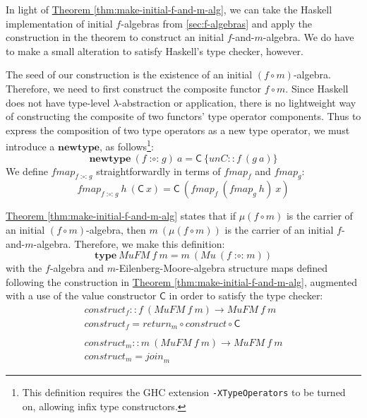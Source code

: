 \documentclass{jfp1}
\newcommand{\thmref}[1]{\hyperref[#1]{Theorem \ref*{#1}}}
\newcommand{\kw}[1]{\textbf{#1}}
\begin{document}
\newcommand{\fcompose}{\mathop{\mathord:\circ\mathord:}}

In light of \thmref{thm:make-initial-f-and-m-alg}, we can take the
Haskell implementation of initial $f$-algebras from
\autoref{sec:f-algebras} and apply the construction in the
theorem to construct an initial $f$-and-$m$-algebra. We do have to
make a small alteration to satisfy Haskell's type checker, however.

The seed of our construction is the existence of an initial $(f \circ
m)$-algebra. Therefore, we need to first construct the composite
functor $f \circ m$. Since Haskell does not have type-level
$\lambda$-abstraction or application, there is no lightweight way of
constructing the composite of two functors' type operator
components. Thus to express the composition of two type operators as
a new type operator, we must introduce a $\kw{newtype}$, as
follows\footnote{This definition requires the GHC extension
  \texttt{-XTypeOperators} to be turned on, allowing infix type
  constructors.}:
\begin{displaymath}
  \kw{newtype}~(f \fcompose g)~a = \mathsf{C}~\{\mathit{unC} :: f~(g~a) \}
\end{displaymath}
We define $\mathit{fmap}_{f\fcompose g}$ straightforwardly in terms of
$\mathit{fmap}_f$ and $\mathit{fmap}_g$:
\begin{displaymath}
  \mathit{fmap}_{f\fcompose g}~h~(\mathsf{C}~x) = \mathsf{C}~(\mathit{fmap}_f~(\mathit{fmap}_g~h)~x)
\end{displaymath}

\thmref{thm:make-initial-f-and-m-alg} states that if $\mu(f \circ m)$
is the carrier of an initial $(f \circ m)$-algebra, then $m~(\mu(f
\circ m))$ is the carrier of an initial
$f$-and-$m$-algebra. Therefore, we make this definition:
\begin{displaymath}
  \kw{type}~\mathit{MuFM}~f~m = m~(\mathit{Mu}~(f \fcompose m))
\end{displaymath}
with the $f$-algebra and $m$-Eilenberg-Moore-algebra structure maps
defined following the construction in
\thmref{thm:make-initial-f-and-m-alg}, augmented with a use of the
value constructor $\mathsf{C}$ in order to satisfy the type checker:
\begin{displaymath}
  \begin{array}{l}
    \mathit{construct}_f :: f~(\mathit{MuFM}~f~m) \to \mathit{MuFM}~f~m \\
    \mathit{construct}_f = \mathit{return}_m \circ \mathit{construct} \circ \mathsf{C} \\
    \\
    \mathit{construct}_m :: m~(\mathit{MuFM}~f~m) \to \mathit{MuFM}~f~m \\
    \mathit{construct}_m = \mathit{join}_m
  \end{array}
\end{displaymath}
\end{document}
